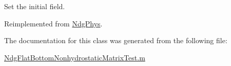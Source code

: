 Set the initial field. 



Reimplemented from \hyperlink{class_ndg_phys_a300c8d73472e9397d961b5d1aa5470e1}{Ndg\+Phys}.



The documentation for this class was generated from the following file\+:\begin{DoxyCompactItemize}
\item 
\hyperlink{_ndg_flat_bottom_nonhydrostatic_matrix_test_8m}{Ndg\+Flat\+Bottom\+Nonhydrostatic\+Matrix\+Test.\+m}\end{DoxyCompactItemize}
